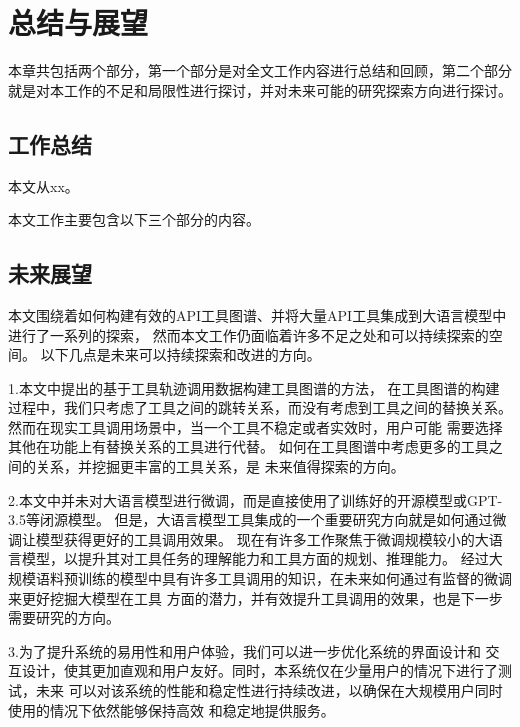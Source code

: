 
\chapter{总结与展望}

\indent 本章共包括两个部分，第一个部分是对全文工作内容进行总结和回顾，第二个部分就是对本工作的不足和局限性进行探讨，并对未来可能的研究探索方向进行探讨。

\section{工作总结}

\indent 本文从xx。

本文工作主要包含以下三个部分的内容。

\section{未来展望}

本文围绕着如何构建有效的API工具图谱、并将大量API工具集成到大语言模型中进行了一系列的探索，
然而本文工作仍面临着许多不足之处和可以持续探索的空间。
以下几点是未来可以持续探索和改进的方向。

\indent 1.本文中提出的基于工具轨迹调用数据构建工具图谱的方法，
在工具图谱的构建过程中，我们只考虑了工具之间的跳转关系，而没有考虑到工具之间的替换关系。
然而在现实工具调用场景中，当一个工具不稳定或者实效时，用户可能
需要选择其他在功能上有替换关系的工具进行代替。
如何在工具图谱中考虑更多的工具之间的关系，并挖掘更丰富的工具关系，是
未来值得探索的方向。

\indent 2.本文中并未对大语言模型进行微调，而是直接使用了训练好的开源模型或GPT-3.5等闭源模型。
但是，大语言模型工具集成的一个重要研究方向就是如何通过微调让模型获得更好的工具调用效果。
现在有许多工作聚焦于微调规模较小的大语言模型，以提升其对工具任务的理解能力和工具方面的规划、推理能力。
经过大规模语料预训练的模型中具有许多工具调用的知识，在未来如何通过有监督的微调来更好挖掘大模型在工具
方面的潜力，并有效提升工具调用的效果，也是下一步需要研究的方向。

\indent 3.为了提升系统的易用性和用户体验，我们可以进一步优化系统的界面设计和
交互设计，使其更加直观和用户友好。同时，本系统仅在少量用户的情况下进行了测试，未来
可以对该系统的性能和稳定性进行持续改进，以确保在大规模用户同时使用的情况下依然能够保持高效
和稳定地提供服务。
